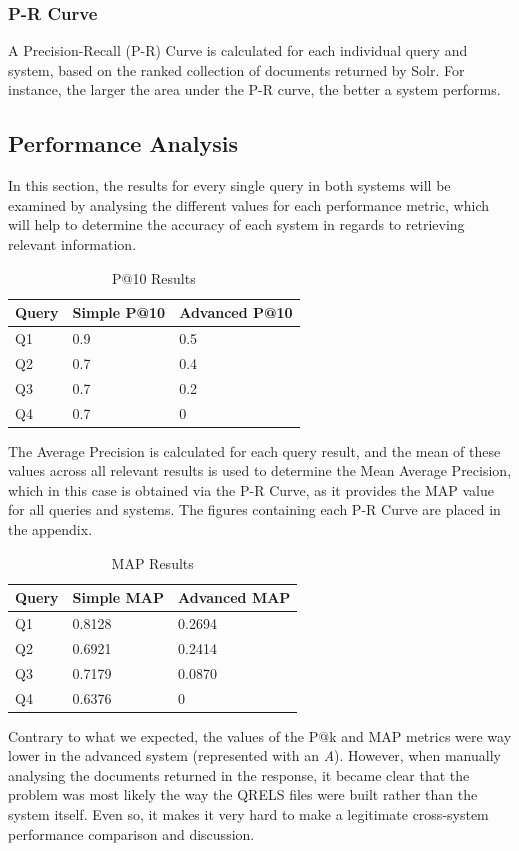 \documentclass[sigconf]{acmart}
\begin{document}
\subsubsection{P-R Curve}

A Precision-Recall (P-R) Curve\cite{prcurves} is calculated for each individual query and system, based on the ranked collection of documents returned by Solr. For instance, the larger the area under the P-R curve\cite{auc}, the better a system performs.

\subsection{Performance Analysis}

In this section, the results for every single query in both systems will be examined by analysing the different values for each performance metric, which will help to determine the accuracy of each system in regards to retrieving relevant information.\newline

\begin{table}[H]
	\begin{tabular}{ | m{5em} | m{1cm}| m{1.2cm} | } 
		\hline
		Query& Simple P@10 & Advanced P@10 \\ 
		\hline
		Q1 & 0.9 & 0.5 \\ 
		\hline
		Q2 & 0.7 & 0.4 \\ 
		\hline
		Q3 & 0.7 & 0.2 \\ 
		\hline
		Q4 & 0.7 & 0 \\ 
		\hline
	\end{tabular}
	\caption{P@10 Results}
	\label{tab:pat10_results}
\end{table}
The Average Precision is calculated for each query result, and the mean of these values across all relevant results is used to determine the Mean Average Precision, which in this case is obtained via the P-R Curve, as it provides the MAP value for all queries and systems. The figures containing each P-R Curve are placed in the appendix. \newline

\begin{table}[H]
	\begin{tabular}{ | m{5em} | m{1cm}| m{1.2cm} | } 
		\hline
		Query& Simple MAP & Advanced MAP \\ 
		\hline
		Q1 & 0.8128 & 0.2694 \\ 
		\hline
		Q2 & 0.6921 & 0.2414 \\ 
		\hline
		Q3 & 0.7179 & 0.0870 \\ 
		\hline
		Q4 & 0.6376 & 0 \\ 
		\hline
	\end{tabular}
	\caption{MAP Results}
	\label{tab:map_results}
\end{table}
Contrary to what we expected, the values of the P@k and MAP metrics were way lower in the advanced system (represented with an \textit{A}). However, when manually analysing the documents returned in the response, it became clear that the problem was most likely the way the QRELS files were built rather than the system itself. Even so, it makes it very hard to make a legitimate cross-system performance comparison and discussion.
\end{document}
